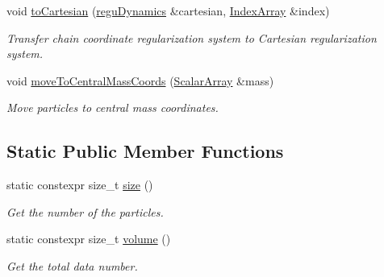 \begin{DoxyCompactItemize}
void \mbox{\hyperlink{classregu_dynamics_a3dd8d377588308a02396ca6d06945859}{to\+Cartesian}} (\mbox{\hyperlink{classregu_dynamics}{regu\+Dynamics}} \&cartesian, \mbox{\hyperlink{classregu_dynamics_a2c9fa7372e4a11be9d85728b4a0e455f}{Index\+Array}} \&index)
\begin{DoxyCompactList}\small\item\em Transfer chain coordinate regularization system to Cartesian regularization system. \end{DoxyCompactList}\item 
void \mbox{\hyperlink{classregu_dynamics_adb57f1775922d615b8e506eaf79a1bc0}{move\+To\+Central\+Mass\+Coords}} (\mbox{\hyperlink{classregu_dynamics_a34b4b77ea3e49e1cdef584ec8bd281dc}{Scalar\+Array}} \&mass)
\begin{DoxyCompactList}\small\item\em Move particles to central mass coordinates. \end{DoxyCompactList}\end{DoxyCompactItemize}
\subsection*{Static Public Member Functions}
\begin{DoxyCompactItemize}
\item 
static constexpr size\+\_\+t \mbox{\hyperlink{classregu_dynamics_a794ed66952b542ae63caa936e3641c4a}{size}} ()
\begin{DoxyCompactList}\small\item\em Get the number of the particles. \end{DoxyCompactList}\item 
static constexpr size\+\_\+t \mbox{\hyperlink{classregu_dynamics_a3a00b2009ce88898871ca024c30c6882}{volume}} ()
\begin{DoxyCompactList}\small\item\em Get the total data number. \end{DoxyCompactList}\end{DoxyCompactItemize}
